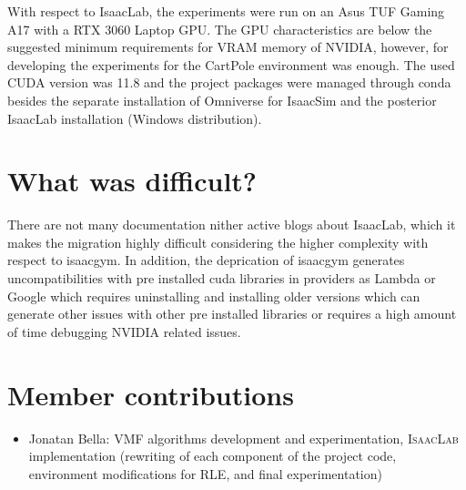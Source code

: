 \documentclass{article}  %
\begin{document}
With respect to IsaacLab, the experiments were run on an Asus TUF Gaming A17 with a RTX 3060 Laptop GPU. The GPU characteristics are below 
the suggested minimum requirements for VRAM memory of NVIDIA, however, for developing the experiments for the CartPole environment was enough.
The used CUDA version was 11.8 and the project packages were managed through conda besides the separate installation of Omniverse for IsaacSim and 
the posterior IsaacLab installation (Windows distribution). 


\section*{What was difficult?}
There are not many documentation nither active blogs about IsaacLab, which it makes the migration highly difficult considering the higher complexity with respect
to isaacgym. In addition, the deprication of isaacgym generates uncompatibilities with pre installed cuda libraries in providers as Lambda or Google which requires uninstalling
and installing older versions which can generate other issues with other pre installed libraries or requires a high amount of time debugging NVIDIA related issues.  



\section*{Member contributions}
\begin{itemize}
    \item Jonatan Bella: VMF algorithms development and experimentation, \textsc{IsaacLab} implementation (rewriting of each component of the project code, environment modifications
    for RLE, and final experimentation)
\end{itemize}
\end{document}
